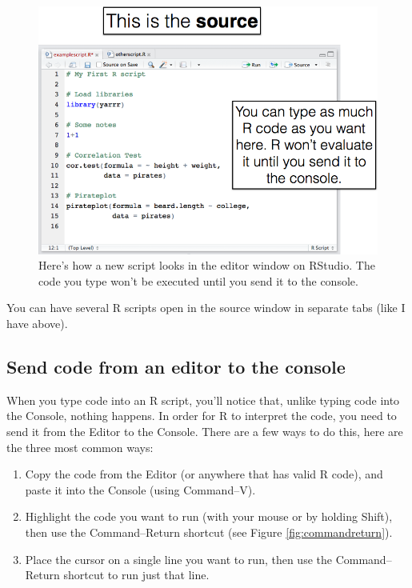\documentclass[]{book}
\theoremstyle{definition}
\theoremstyle{definition}
\theoremstyle{remark}
\begin{document}
\begin{figure}

{\centering \includegraphics[width=600px]{images/sourcess} 

}

\caption{Here's how a new script looks in the editor window on RStudio. The code you type won't be executed until you send it to the console.}\label{fig:editor}
\end{figure}

You can have several R scripts open in the source window in separate
tabs (like I have above).

\subsection{Send code from an editor to the
console}\label{send-code-from-an-editor-to-the-console}

When you type code into an R script, you'll notice that, unlike typing
code into the Console, nothing happens. In order for R to interpret the
code, you need to send it from the Editor to the Console. There are a
few ways to do this, here are the three most common ways:

\begin{enumerate}
\def\labelenumi{\arabic{enumi}.}
\item
  Copy the code from the Editor (or anywhere that has valid R code), and
  paste it into the Console (using Command--V).
\item
  Highlight the code you want to run (with your mouse or by holding
  Shift), then use the Command--Return shortcut (see Figure
  \ref{fig:commandreturn}).
\item
  Place the cursor on a single line you want to run, then use the
  Command--Return shortcut to run just that line.
\end{enumerate}
\end{document}
